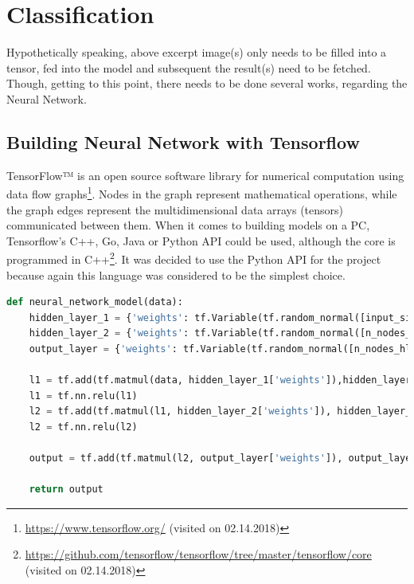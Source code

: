 \section{Classification}
Hypothetically speaking, above excerpt image(s) only needs to be filled into a tensor, fed into the model and subsequent the result(s) need to be fetched. Though, getting to this point, there needs to be done several works, regarding the Neural Network.  

\subsection{Building Neural Network with Tensorflow}
TensorFlow™ is an open source software library for numerical computation using data flow graphs\footnote{\url{https://www.tensorflow.org/} (visited on 02.14.2018)}. Nodes in the graph represent mathematical operations, while the graph edges represent the multidimensional data arrays (tensors) communicated between them. When it comes to building models on a PC, Tensorflow's C++, Go, Java or Python API could be used, although the core is programmed in C++\footnote{\url{https://github.com/tensorflow/tensorflow/tree/master/tensorflow/core} (visited on 02.14.2018)}. It was decided to use the Python API for the project because again this language was considered to be the simplest choice. \newline

\begin{minipage}{0.95\linewidth}
	\begin{lstlisting}[language=python,  caption={Creating Neural Network}, label={lst:createnn},captionpos=b]
	def neural_network_model(data):
	hidden_layer_1 = {'weights': tf.Variable(tf.random_normal([input_size, n_nodes_hl1])), 'biases': tf.Variable(tf.random_normal([n_nodes_hl1]))}
	hidden_layer_2 = {'weights': tf.Variable(tf.random_normal([n_nodes_hl1, n_nodes_hl2])), 'biases': tf.Variable(tf.random_normal([n_nodes_hl2]))}
	output_layer = {'weights': tf.Variable(tf.random_normal([n_nodes_hl2, n_classes])), 'biases': tf.Variable(tf.random_normal([n_classes]))}
	
	l1 = tf.add(tf.matmul(data, hidden_layer_1['weights']),hidden_layer_1['biases'])
	l1 = tf.nn.relu(l1)
	l2 = tf.add(tf.matmul(l1, hidden_layer_2['weights']), hidden_layer_2['biases'])
	l2 = tf.nn.relu(l2)
	
	output = tf.add(tf.matmul(l2, output_layer['weights']), output_layer['biases'])
	
	return output
	\end{lstlisting}
\end{minipage}

